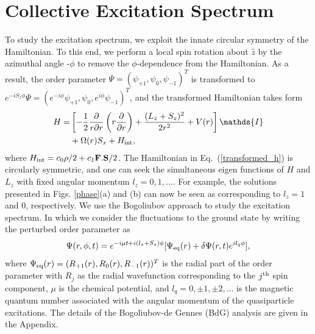 \documentclass[pra,twocolumn,aps,superscriptaddress,showpacs,longbibliography]{revtex4-1}
\begin{document}
\section{Collective Excitation Spectrum}
\label{Sec-IV}
To study the excitation spectrum, we exploit the innate circular symmetry of the Hamiltonian. To this end, 
we perform a local spin rotation about $\hat{z}$ by the azimuthal angle -$\phi$ to remove the $\phi$-dependence from
the Hamiltonian. As a result, the order parameter $\Psi = (\psi_{+1}, \psi_0, \psi_{-1})^T$ is transformed to 
$e^{-i S_z\phi}{\Psi} =(e^{-i\phi}\psi_{+1}, \psi_0, e^{i\phi} \psi_{-1})^T$, and the transformed Hamiltonian
takes form
\begin{align}
\label{transformed_h}
{H} =& \left[-\frac{1}{2}\frac{\partial}{r \partial r}\left(r\frac{\partial}{\partial r}\right)+\frac{(L_z+S_z)^2}{2 r^2}+ V(r)\right]\mathds{I}\nonumber  \\ 
&+\Omega(r)S_x  + H_{\rm int},
\end{align}
where {${H}_{\rm int} = c_0\rho/2+
c_1{\bf {F}}.{\bf S}/2$}. The Hamiltonian in Eq.~(\ref{transformed_h}) is circularly symmetric, and one can seek
the simultaneous eigen functions of $H$ and $L_z$ with fixed angular momentum $l_z = 0, 1, \ldots$.
For example, the solutions presented in Figs. \ref{phase}(a) and (b) can now be seen as
corresponding to $l_z=1$ and $0$, respectively.
We use the Bogoliubov approach to study the excitation spectrum. 
{\color{black}
In which we consider the fluctuations to the ground state by writing the perturbed order parameter
as
\begin{equation}\label{pop}
    {\Psi}(r,\phi,t) = e^{-i\mu t +i(l_z+S_z)\phi} [\Psi_{\rm eq}(r) +\delta {\Psi}(r,t)e^{i l_q \phi}],
\end{equation}
where $\Psi_{\rm eq}(r)=(R_{+1}(r), R_{0}(r), R_{-1}(r))^{T}$ is the radial part of the order parameter with  $R_{j}$ as the radial wavefunction
corresponding to the $j^{\rm th}$ spin component, $\mu$ is the chemical potential, and $l_q = 0, \pm1, \pm2,\ldots$ is the magnetic quantum number
associated with the angular momentum of the quasiparticle excitations.}
The details of the Bogoliubov-de Gennes (BdG) analysis are given in the Appendix. 
\end{document}
